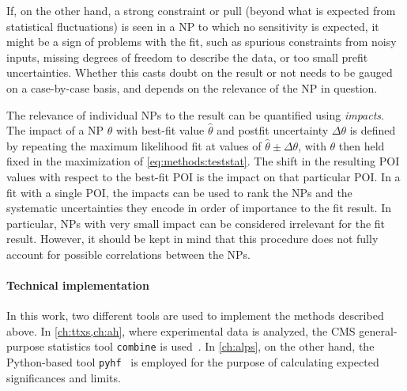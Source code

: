 If, on the other hand, a strong constraint or pull (beyond what is expected from statistical fluctuations) is seen in a NP to which no sensitivity is expected, it might be a sign of problems with the fit, such as spurious constraints from noisy inputs, missing degrees of freedom to describe the data, or too small prefit uncertainties. Whether this casts doubt on the result or not needs to be gauged on a case-by-case basis, and depends on the relevance of the NP in question.

The relevance of individual NPs to the result can be quantified using \textit{impacts}. The impact of a NP $\theta$ with best-fit value $\hat{\theta}$ and postfit uncertainty $\Delta \theta$ is defined by repeating the maximum likelihood fit at values of $\hat{\theta} \pm \Delta \theta$, with $\theta$ then held fixed in the maximization of \cref{eq:methods:teststat}. The shift in the resulting POI values with respect to the best-fit POI is the impact on that particular POI. In a fit with a single POI, the impacts can be used to rank the NPs and the systematic uncertainties they encode in order of importance to the fit result. In particular, NPs with very small impact can be considered irrelevant for the fit result. However, it should be kept in mind that this procedure does not fully account for possible correlations between the NPs.

\paragraph{Technical implementation}
In this work, two different tools are used to implement the methods described above. In \cref{ch:ttxs,ch:ah}, where experimental data is analyzed, the CMS general-purpose statistics tool \texttt{combine} is used~\cite{CMS:CAT-23-001}. In \cref{ch:alps}, on the other hand, the Python-based tool \texttt{pyhf}~\cite{pyhf,pyhf_joss} is employed for the purpose of calculating expected significances and limits.



